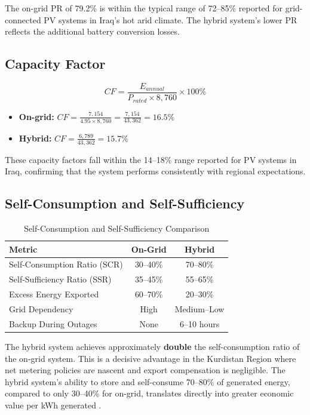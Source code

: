 The on-grid PR of 79.2\% is within the typical range of 72--85\% reported for grid-connected PV systems in Iraq's hot arid climate. The hybrid system's lower PR reflects the additional battery conversion losses.


\subsection{Capacity Factor}

\begin{equation}
    CF = \frac{E_{annual}}{P_{rated} \times 8{,}760} \times 100\%
\end{equation}

\begin{itemize}
    \item \textbf{On-grid:} $CF = \frac{7{,}154}{4.95 \times 8{,}760} = \frac{7{,}154}{43{,}362} = 16.5\%$
    \item \textbf{Hybrid:} $CF = \frac{6{,}789}{43{,}362} = 15.7\%$
\end{itemize}

These capacity factors fall within the 14--18\% range reported for PV systems in Iraq, confirming that the system performs consistently with regional expectations.


\subsection{Self-Consumption and Self-Sufficiency}
\label{sec:self_consumption}

\begin{table}[H]
\centering
\caption{Self-Consumption and Self-Sufficiency Comparison}
\label{tab:self_consumption}
\begin{tabular}{@{}p{5cm} c c@{}}
\toprule
\textbf{Metric} & \textbf{On-Grid} & \textbf{Hybrid} \\
\midrule
Self-Consumption Ratio (SCR) & 30--40\% & 70--80\% \\
Self-Sufficiency Ratio (SSR) & 35--45\% & 55--65\% \\
Excess Energy Exported & 60--70\% & 20--30\% \\
Grid Dependency & High & Medium--Low \\
Backup During Outages & None & 6--10 hours \\
\bottomrule
\end{tabular}
\end{table}

The hybrid system achieves approximately \textbf{double} the self-consumption ratio of the on-grid system. This is a decisive advantage in the Kurdistan Region where net metering policies are nascent and export compensation is negligible. The hybrid system's ability to store and self-consume 70--80\% of generated energy, compared to only 30--40\% for on-grid, translates directly into greater economic value per kWh generated \cite{koskela2019}.


